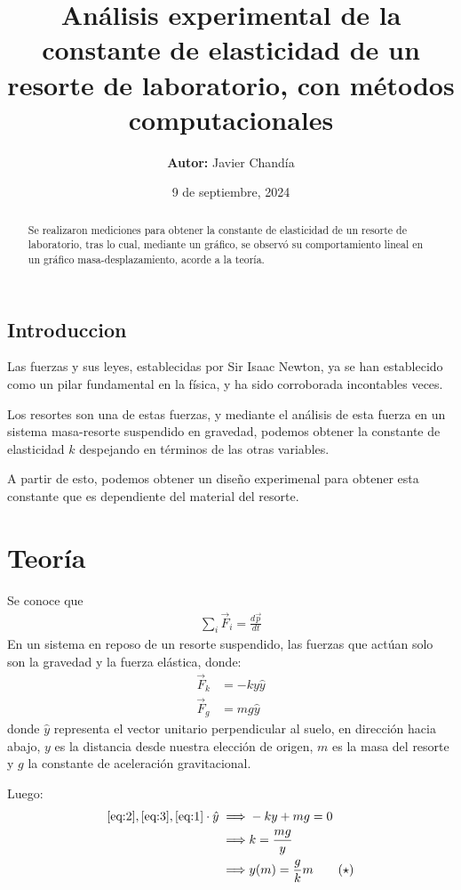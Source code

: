 \documentclass{article}
\title{Análisis experimental de la constante de elasticidad de un resorte de laboratorio, con métodos computacionales}
\author{
    \textbf{Autor: } Javier Chandía }
\date{9 de septiembre, 2024}
\begin{document}
\maketitle

\begin{multicols}{2}
\begin{abstract}
    Se realizaron mediciones para obtener la constante de elasticidad de un resorte de laboratorio, tras lo cual, mediante un gráfico, se observó su comportamiento lineal en un gráfico masa-desplazamiento, acorde a la teoría.
\end{abstract}
\begin{center}
    \section{Introduccion}
\end{center}
Las fuerzas y sus leyes, establecidas por Sir Isaac Newton, ya se han establecido como un pilar fundamental en la física, y ha sido corroborada incontables veces.

Los resortes son una de estas fuerzas, y mediante el análisis de esta fuerza en un sistema masa-resorte suspendido en gravedad, podemos obtener la constante de elasticidad $k$ despejando en términos de las otras variables. 

A partir de esto, podemos obtener un diseño experimenal para obtener esta constante que es dependiente del material del resorte.

\centering
    \section{Teoría}
\raggedright
Se conoce que \begin{align}
    \sum_{i} \vec{F}_i=\frac{d\vec{p}}{dt} \label{eq:1}
\end{align}
En un sistema en reposo de un resorte suspendido, las fuerzas que actúan solo son la gravedad y la fuerza elástica, donde:
\begin{align}
    \label{eq:2} \vec{F}_{k}&= - k y \hat{y}\\ 
    \vec{F}_{g}&= mg \hat{y} \label{eq:3}
\end{align}
donde $\hat{y}$ representa el vector unitario perpendicular al suelo, en dirección  hacia abajo, $y$ es la distancia desde nuestra elección de origen, $m$ es la masa del resorte y $g$ la constante de aceleración gravitacional.

Luego:
\begin{align*}
   \eqref{eq:2},\eqref{eq:3},\eqref{eq:1}\cdot\hat{y} \implies & -ky + mg = 0\\
   \implies & k=\frac{mg}{y}\\
   \implies & y(m) = \frac{g}{k} m \tag{$\star$}  \label{eq:estrella}
\end{align*}


\end{multicols}
\end{document}

